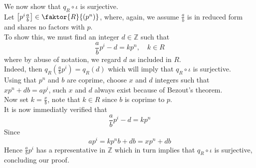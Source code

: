 \documentclass[11pt, a4paper]{article}
\begin{document}
We now show that $q_R \circ \iota$ is surjective.\\
Let $ \left[ p^{i}\frac{a}{b} \right]\in \faktor { R} { ( p^{n}) }  $, where, again, we assume $\frac{a}{b}$ is in reduced form and shares no factors with $p$.\\
To show this, we must find an integer $d \in \mathbb{Z}$ such that 
\[ 
\frac{a}{b}p^{i}- d = k p^{n}, \quad k \in R 
\]
where by abuse of notation, we regard $d$ as included in $ R$.\\
Indeed, then $ q_R( \frac{a}{b}p^{i} )= q_R( d) $ which will imply that $q_R \circ \iota$ is surjective.\\
Using that $p^{n}$ and $b$ are coprime, choose $x$ and $d$ integers such that $xp^{n}+ db= ap^{i}$, such $x$ and $d$ always exist because of Bezout's theorem.\\
Now set $k= \frac{x}{b}$, note that $k \in R$ since $b$ is coprime to $p$.\\
It is now immediatly verified that 
\[ 
\frac{a}{b}p^{i}-d = kp^{n}
\]
Since
\[ 
ap^{i}= kp^{n} b + db = xp^{n} + db 
\]
Hence $\frac{a}{b}p^{i}$ has a representative in $ \mathbb{Z}$ which in turn implies that $q_R \circ\iota$ is surjective, concluding our proof.
\end{document}
